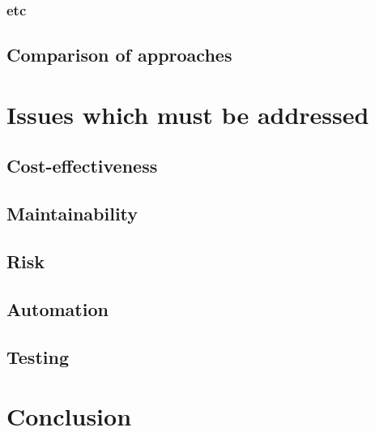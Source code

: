 \documentclass[12pt,journal,compsoc]{IEEEtran}
\begin{document}
\subsubsection{etc}

\subsection{Comparison of approaches}
\label{subsec:comparison}

\section{Issues which must be addressed}
\label{sec:issues}

\subsection{Cost-effectiveness}
\label{subsec:costeffectiveness}

\subsection{Maintainability}
\label{subsec:maintainability}

\subsection{Risk}
\label{subsec:risk}

\subsection{Automation}
\label{subsec:automation}

\subsection{Testing}
\label{subsec:testing}

\section{Conclusion}
\label{sec:conclusion}

\appendices

\end{document}
